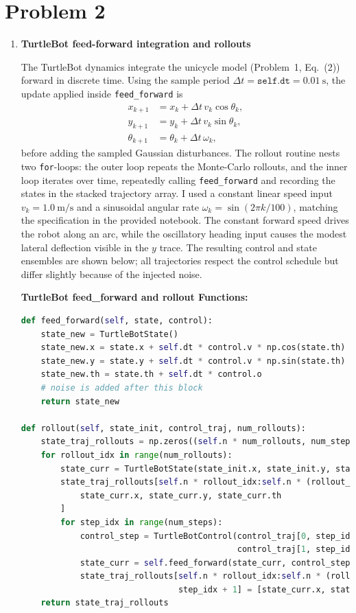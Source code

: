 \documentclass [11pt]{article}
\begin{document}
\section*{Problem 2}
    \begin{enumerate}[label=(\roman*)]
        \item \textbf{TurtleBot feed-forward integration and rollouts}

The TurtleBot dynamics integrate the unicycle model (Problem~1, Eq.~(2)) forward in discrete time. Using the sample period $\Delta t = \texttt{self.dt} = 0.01~\text{s}$, the update applied inside \texttt{feed\_forward} is
        \begin{align}
            x_{k+1} &= x_k + \Delta t\, v_k \cos\theta_k,\\
            y_{k+1} &= y_k + \Delta t\, v_k \sin\theta_k,\\
            \theta_{k+1} &= \theta_k + \Delta t\, \omega_k,
        \end{align}
        before adding the sampled Gaussian disturbances. The rollout routine nests two \texttt{for}-loops: the outer loop repeats the Monte-Carlo rollouts, and the inner loop iterates over time, repeatedly calling \texttt{feed\_forward} and recording the states in the stacked trajectory array. I used a constant linear speed input $v_k = 1.0~\text{m/s}$ and a sinusoidal angular rate $\omega_k = \sin(2\pi k/100)$, matching the specification in the provided notebook. The constant forward speed drives the robot along an arc, while the oscillatory heading input causes the modest lateral deflection visible in the $y$ trace. The resulting control and state ensembles are shown below; all trajectories respect the control schedule but differ slightly because of the injected noise.

        \textbf{TurtleBot feed\_forward and rollout Functions:}
\begin{lstlisting}[language=Python]
def feed_forward(self, state, control):
    state_new = TurtleBotState()
    state_new.x = state.x + self.dt * control.v * np.cos(state.th)
    state_new.y = state.y + self.dt * control.v * np.sin(state.th)
    state_new.th = state.th + self.dt * control.o
    # noise is added after this block
    return state_new

def rollout(self, state_init, control_traj, num_rollouts):
    state_traj_rollouts = np.zeros((self.n * num_rollouts, num_steps + 1))
    for rollout_idx in range(num_rollouts):
        state_curr = TurtleBotState(state_init.x, state_init.y, state_init.th)
        state_traj_rollouts[self.n * rollout_idx:self.n * (rollout_idx + 1), 0] = [
            state_curr.x, state_curr.y, state_curr.th
        ]
        for step_idx in range(num_steps):
            control_step = TurtleBotControl(control_traj[0, step_idx],
                                            control_traj[1, step_idx])
            state_curr = self.feed_forward(state_curr, control_step)
            state_traj_rollouts[self.n * rollout_idx:self.n * (rollout_idx + 1),
                                step_idx + 1] = [state_curr.x, state_curr.y, state_curr.th]
    return state_traj_rollouts
\end{lstlisting}


\end{enumerate}
\end{document}
